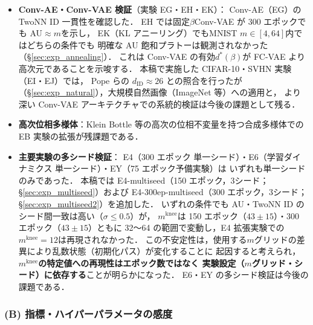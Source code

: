 \documentclass[11pt,a4paper]{jsarticle}
\newcommand{\mknee}{m^{\mathrm{knee}}}
\begin{document}
\begin{itemize}
  \item \textbf{Conv-AE・Conv-VAE 検証}（実験 EG・EH・EK）：
        Conv-AE（EG）の TwoNN ID 一貫性を確認した．
        EH では固定$\beta$Conv-VAE が 300 エポックでも AU$\approx m$を示し，
        EK（KL アニーリング）でもMNIST $m\in[4,64]$内ではどちらの条件でも
        明確な AU 飽和プラトーは観測されなかった（§\ref{sec:exp_annealing}）．
        これは Conv-VAE の有効$d^*(\beta)$が FC-VAE より高次元であることを示唆する．
        本稿で実施した CIFAR-10・SVHN 実験（EI・EJ）では，
        Pope ら\cite{pope2021intrinsic}の $d_\mathrm{ID} \approx 26$ との照合を行ったが
        （§\ref{sec:exp_natural}），大規模自然画像（ImageNet 等）への適用と，
        より深い Conv-VAE アーキテクチャでの系統的検証は今後の課題として残る．
  \item \textbf{高次位相多様体}：Klein Bottle 等の高次の位相不変量を持つ合成多様体での
        EB 実験の拡張が残課題である．
  \item \textbf{主要実験の多シード検証}：
        E4（300 エポック 単一シード）・E6（学習ダイナミクス 単一シード）・EY（75 エポック予備実験）は
        いずれも単一シードのみであった．
        本稿では E4-multiseed（150 エポック，3シード；§\ref{sec:exp_multiseed}）および
        E4-300ep-multiseed（300 エポック，3シード；§\ref{sec:exp_multiseed2}）を追加した．
        いずれの条件でも AU・TwoNN ID のシード間一致は高い（$\sigma \leq 0.5$）が，
        $\mknee$は 150 エポック（$43 \pm 15$）・300 エポック（$43 \pm 15$）ともに
        32〜64 の範囲で変動し，E4 拡張実験での$\mknee = 12$は再現されなかった．
        この不安定性は，使用する$m$グリッドの差異により乱数状態（初期化パス）が変化することに
        起因すると考えられ，\textbf{$\mknee$の特定値への再現性はエポック数ではなく
        実験設定（$m$グリッド・シード）に依存する}ことが明らかになった．
        E6・EY の多シード検証は今後の課題である．
\end{itemize}

\subsubsection*{(B) 指標・ハイパーパラメータの感度}
\end{document}
